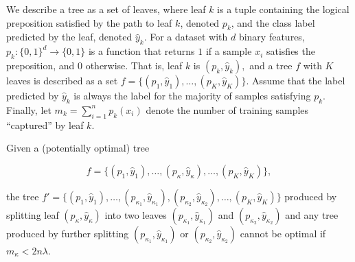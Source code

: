 \documentclass{article}
\begin{document}
    \begin{theorem}
    We describe a tree as a set of leaves, where leaf $k$ is a tuple containing the logical preposition satisfied by the path to leaf $k$, denoted $p_k $, and the class label predicted by the leaf, denoted $\hat{y}_k$. For a dataset with $d$ binary features, $p_k: \{0, 1\}^d \to \{0, 1\}$ is a function that returns $1$ if a sample $x_i$ satisfies the preposition, and $0$ otherwise. That is, leaf $k$ is $(p_k, \hat{y}_k),$ and a tree $f$ with $K$ leaves is described as a set $f = \{(p_1, \hat{y}_1), \hdots, (p_K, \hat{y}_K)\}$. Assume that the label predicted by $\hat{y}_k$ is always the label for the majority of samples satisfying $p_k$. Finally, let $m_k = \sum_{i=1}^n p_k(x_i)$ denote the number of training samples ``captured'' by leaf $k$.

    Given a (potentially optimal) tree 

      \[f = \{(p_1, \hat{y}_1), \hdots, (p_{\kappa}, \hat{y}_{\kappa}), \hdots, (p_K, \hat{y}_K)\}, \]

    the tree $f' = \{(p_1, \hat{y}_1), \hdots, (p_{\kappa_1}, \hat{y}_{\kappa_1}), (p_{\kappa_2}, \hat{y}_{\kappa_2}), \hdots, (p_K, \hat{y}_K)\}$ produced by splitting leaf $(p_{\kappa}, \hat{y}_{\kappa})$ into two leaves $(p_{\kappa_1}, \hat{y}_{\kappa_1})$ and $(p_{\kappa_2}, \hat{y}_{\kappa_2})$ and any tree produced by further splitting $(p_{\kappa_1}, \hat{y}_{\kappa_1})$ or $(p_{\kappa_2}, \hat{y}_{\kappa_2})$ cannot  be optimal if $m_{\kappa} < 2n\lambda$.
    \end{theorem}
\end{document}
